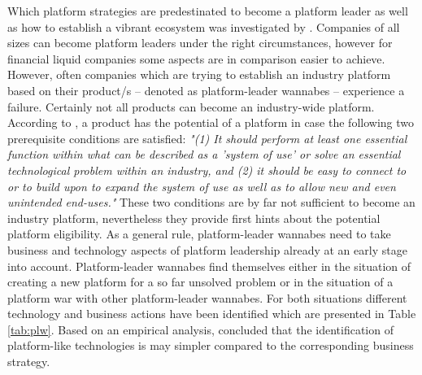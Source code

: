 Which platform strategies are predestinated to become a platform leader as well as how to establish a vibrant ecosystem was investigated by \citet{Gawer2008}. Companies of all sizes can become platform leaders under the right circumstances, however for financial liquid companies some aspects are in comparison easier to achieve. However, often companies which are trying to establish an industry platform based on their product/s -- denoted as platform-leader wannabes -- experience a failure. Certainly not all products can become an industry-wide platform. According to \citet[p. 29]{Gawer2008}, a product has the potential of a platform in case the following two prerequisite conditions are satisfied: \textit{"(1) It should perform at least one essential function within what can be described as a 'system of use' or solve an essential technological problem within an industry, and (2) it should be easy to connect to or to build upon to expand the system of use as well as to allow new and even unintended end-uses."} These two conditions are by far not sufficient to become an industry platform, nevertheless they provide first hints about the potential platform eligibility. As a general rule, platform-leader wannabes need to take business and technology aspects of platform leadership already at an early stage into account. Platform-leader wannabes find themselves either in the situation of creating a new platform for a so far unsolved problem or in the situation of a platform war with other platform-leader wannabes. For both situations different technology and business actions have been identified which are presented in Table \ref{tab:plw}. Based on an empirical analysis, \citet{Gawer2008} concluded that the identification of platform-like technologies is may simpler compared to the corresponding business strategy.

